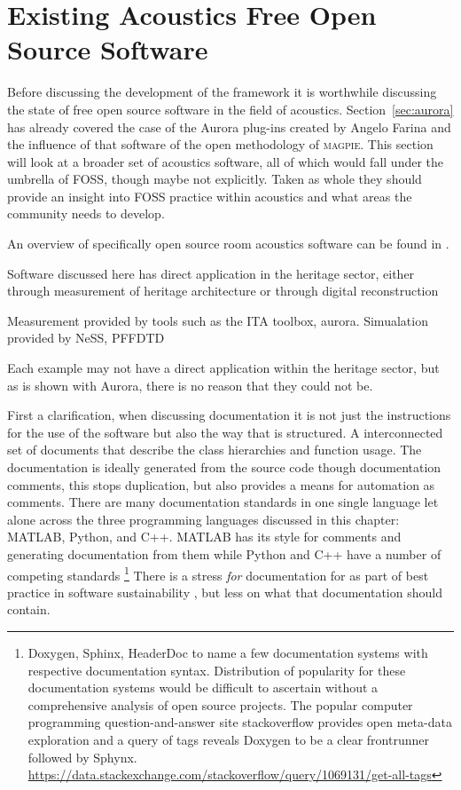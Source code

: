 \section{Existing Acoustics Free Open Source Software}

Before discussing the development of the  framework it is worthwhile discussing the state of free open source software in the field of acoustics.
Section~\ref{sec:aurora} has already covered the case of the Aurora plug-ins created by Angelo Farina and the influence of that software of the open methodology of \textsc{magpie}.
This section will look at a broader set of acoustics software, all of which would fall under the umbrella of FOSS, though maybe not explicitly.
Taken as whole they should provide an insight into FOSS practice within acoustics and what areas the community needs to develop.

An overview of specifically open source room acoustics software can be found in \textcite{hornikx_exploring_2024}.

Software discussed here has direct application in the heritage sector, either through measurement of heritage architecture \cite{tronchin_acoustics_1997,fagerlande_adequaccao_2020} or through digital reconstruction \cite{katz_exploring_2020}


Measurement provided by tools such as the ITA toolbox, aurora. Simualation provided by NeSS, PFFDTD 


Each example may not have a direct application within the heritage sector, but as is shown with Aurora, there is no reason that they could not be.

First a clarification, when discussing documentation it is not just the instructions for the use of the software but also the way that is structured. A interconnected set of documents that describe the class hierarchies and function usage.
The documentation is ideally generated from the source code though documentation comments, this stops duplication, but also provides a means for automation as comments.
There are many documentation standards in one single language let alone across the three programming languages discussed in this chapter: MATLAB, Python, and C\textsc{++}. 
MATLAB has its style for comments and generating documentation from them while Python \cite{vanrossum_pep8_2001,goodger_pep257_2001} and C++ have a number of competing standards
\footnote{Doxygen, Sphinx, HeaderDoc to name a few documentation systems with respective documentation syntax. Distribution of popularity for these documentation systems would be difficult to ascertain without a comprehensive analysis of open source projects. The popular computer programming question-and-answer site stackoverflow provides open meta-data exploration and a query of tags reveals Doxygen to be a clear frontrunner followed by Sphynx.\\\url{https://data.stackexchange.com/stackoverflow/query/1069131/get-all-tags}}
There is a stress \textit{for} documentation for as part of best practice in software sustainability \cite{smith_software_2016}, but less on what that documentation should contain. 

